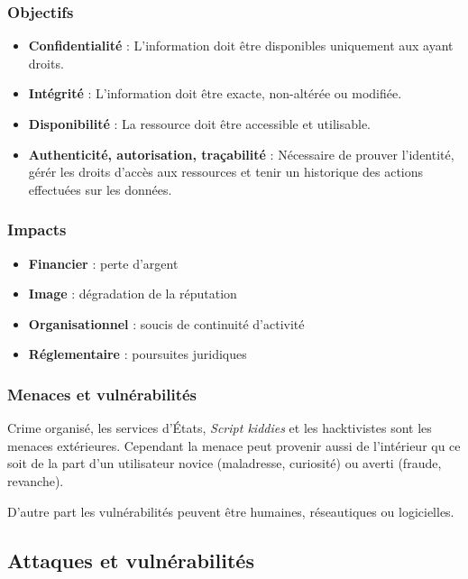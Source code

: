 \documentclass[12pt, a4paper]{article}
\begin{document}
	\subsubsection{Objectifs}
	\begin{itemize}
		\item \textbf{Confidentialité} : L'information doit être disponibles
		uniquement aux ayant droits.
		\item \textbf{Intégrité} : L'information doit être exacte, non-altérée ou
		modifiée.
		\item \textbf{Disponibilité} : La ressource doit être accessible et
		utilisable.
		\item \textbf{Authenticité, autorisation, traçabilité} : Nécessaire de
		prouver l'identité, gérér les droits d'accès aux ressources et tenir un
		historique des actions effectuées sur les données.
	\end{itemize}
	\subsubsection{Impacts}
	\begin{itemize}
		\item \textbf{Financier} : perte d'argent
		\item \textbf{Image} : dégradation de la réputation
		\item \textbf{Organisationnel} : soucis de continuité d'activité
		\item \textbf{Réglementaire} : poursuites juridiques
	\end{itemize}
	\subsubsection{Menaces et vulnérabilités}
	Crime organisé, les services d'États, \textit{Script kiddies} et les
	hacktivistes sont les menaces extérieures. Cependant la menace peut provenir
	aussi de l'intérieur qu ce soit de la part d'un utilisateur novice
	(maladresse, curiosité) ou averti (fraude, revanche).
	\par
	D'autre part les vulnérabilités peuvent être humaines, réseautiques ou
	logicielles.
	\subsection{Attaques et vulnérabilités}
\end{document}
